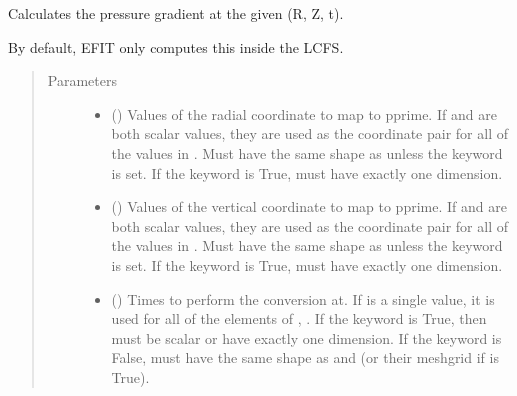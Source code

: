 \documentclass[letterpaper,10pt,english]{sphinxmanual}
\begin{document}
\begin{fulllineitems}
\begin{fulllineitems}
\end{fulllineitems}


\begin{fulllineitems}
\label{\detokenize{eqtools:eqtools.core.Equilibrium.rz2pprime}}
Calculates the pressure gradient at the given (R, Z, t).

By default, EFIT only computes this inside the LCFS.
\begin{quote}\begin{description}
\item[{Parameters}] \leavevmode\begin{itemize}
\item {} 
 () \textendash{} Values of the radial coordinate to
map to pprime. If  and  are both scalar values,
they are used as the coordinate pair for all of the values in
. Must have the same shape as  unless the 
keyword is set. If the  keyword is True,  must
have exactly one dimension.

\item {} 
 () \textendash{} Values of the vertical coordinate to
map to pprime. If  and  are both scalar values,
they are used as the coordinate pair for all of the values in
. Must have the same shape as  unless the 
keyword is set. If the  keyword is True,  must
have exactly one dimension.

\item {} 
 () \textendash{} Times to perform the conversion at.
If  is a single value, it is used for all of the elements of
, . If the  keyword is True, then  must be
scalar or have exactly one dimension. If the  keyword is
False,  must have the same shape as  and  (or their
meshgrid if  is True).


\end{itemize}
\end{description}
\end{quote}
\end{fulllineitems}
\end{fulllineitems}
\end{document}
